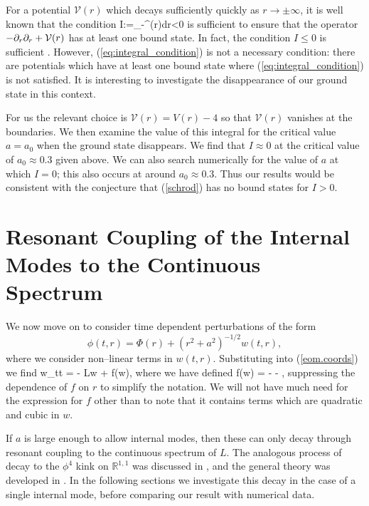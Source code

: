 For a potential $\mathcal{V}(r)$ which decays sufficiently quickly as $r\rightarrow\pm\infty$, it is well known that the condition
\be
\label{eq:integral_condition}
I:=\int_{-\infty}^{\infty}(r)dr<0
\ee
is sufficient to ensure that the operator $-\partial_r\partial_r + \mathcal{V}(r)$ has at least one bound state. In fact, the condition $I\leq 0$ is sufficient \cite{BarrySimon}. However, (\ref{eq:integral_condition}) is not a necessary condition: there are potentials which have at least one bound state where (\ref{eq:integral_condition}) is not satisfied. It is interesting to investigate the disappearance of our ground state in this context.

For us the relevant choice is $\mathcal{V}(r)=V(r)-4$ so that $\mathcal{V}(r)$ vanishes at the boundaries. We then examine the value of this integral for the critical value $a=a_0$ when the ground state disappears. We find that $I\approx0$ at the critical value of $a_0 \approx 0.3$ given above. We can also search numerically for the value of $a$ at which $I=0$; this also occurs at around $a_0 \approx 0.3$. Thus our results would be consistent with the conjecture that (\ref{schrod}) has no bound states for $I>0$.

\section{Resonant Coupling of the Internal Modes to the Continuous Spectrum} \label{sec:dynamics}
We now move on to consider time dependent perturbations of the form
\[
\phi(t,r) = \Phi(r) + (r^2+a^2)^{-1/2}w(t,r),
\]
where we consider non--linear terms in $w(t,r)$. Substituting into (\ref{eom.coords}) we find
\be
\label{eq:nonsmall_pert}
w_{tt} = - Lw + f(w),
\ee
where we have defined
\be \label{eq:f}
f(w) = -  - ,
\ee
suppressing the dependence of $f$ on $r$ to simplify the notation. We will not have much need for the expression for $f$ other than to note that it contains terms which are quadratic and cubic in $w$.

If $a$ is large enough to allow internal modes, then these can only decay through resonant coupling to the continuous spectrum of $L$. The analogous process of decay to the $\phi^4$ kink on $\mathbb{R}^{1,1}$ was discussed in \cite{Manton&Merabet}, and the general theory was developed in \cite{SW98}. In the following sections we investigate this decay in the case of a single internal mode, before comparing our result with numerical data.

